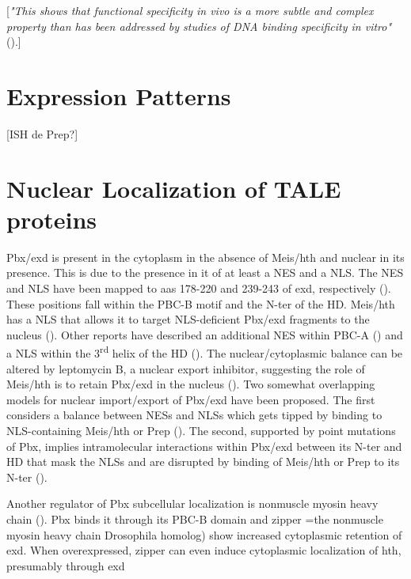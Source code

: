 [\textit{"This shows that functional specificity in vivo is a more subtle and complex property than has been addressed by studies of DNA binding specificity in vitro"} (\cite{Treisman1992}).]



\section{Expression Patterns}

[ISH de Prep?]


\section{Nuclear Localization of TALE proteins}
\label{sec:nuclearLoc}

Pbx/exd is present in the cytoplasm in the absence of Meis/hth and nuclear in its presence. This is due to the presence in it of at least a \ac{NES} and a \ac{NLS}. The \ac{NES} and \ac{NLS} have been mapped to \acp{aa} 178-220 and 239-243 of exd, respectively (\cite{Abu-Shaar1999}). These positions fall within the PBC-B motif and the \ac{N-ter} of the \ac{HD}. Meis/hth has a \ac{NLS} that allows it to target \ac{NLS}-deficient Pbx/exd fragments to the nucleus (\cite{Abu-Shaar1999}). Other reports have described an additional \ac{NES} within PBC-A (\cite{Berthelsen1999}) and a \ac{NLS} within the 3\textsuperscript{rd} helix of the \ac{HD} (\cite{Saleh2000}). The nuclear/cytoplasmic balance can be altered by leptomycin B, a nuclear export inhibitor, suggesting the role of Meis/hth is to retain Pbx/exd in the nucleus (\cite{Berthelsen1999, Abu-Shaar1999}). Two somewhat overlapping models for nuclear import/export of Pbx/exd have been proposed. The first considers a balance between \acp{NES} and \acp{NLS} which gets tipped by binding to \ac{NLS}-containing Meis/hth or Prep (\cite{Affolter1999}). The second, supported by point mutations of Pbx, implies intramolecular interactions within Pbx/exd between its \ac{N-ter} and \ac{HD} that mask the \acp{NLS} and are disrupted by binding of Meis/hth or Prep to its \ac{N-ter} (\cite{Saleh2000}).

Another regulator of Pbx subcellular localization is nonmuscle myosin heavy chain (\cite{Huang2003}). Pbx binds it through its PBC-B domain and zipper =the nonmuscle myosin heavy chain Drosophila homolog) show increased cytoplasmic retention of \ac{exd}. When overexpressed, zipper can even induce cytoplasmic localization of \ac{hth}, presumably through \ac{exd}

